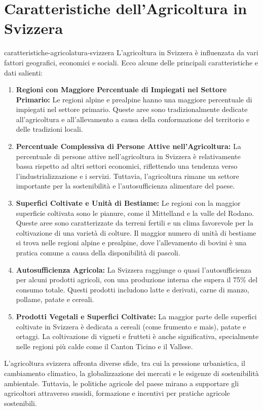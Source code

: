 \documentclass[preview]{standalone}
\begin{document}
\section{Caratteristiche dell'Agricoltura in Svizzera}

\begin{snippet}{caratteristiche-agricolatura-svizzera}
    L'agricoltura in Svizzera è influenzata da vari fattori geografici, economici e sociali. Ecco alcune
    delle principali caratteristiche e dati salienti:
    \begin{enumerate}
        \item \textbf{Regioni con Maggiore Percentuale di Impiegati nel Settore Primario:}
            Le regioni alpine e prealpine hanno una maggiore percentuale di impiegati nel
            settore primario. Queste aree sono tradizionalmente dedicate all'agricoltura e
            all'allevamento a causa della conformazione del territorio e delle tradizioni locali.
        \item \textbf{Percentuale Complessiva di Persone Attive nell'Agricoltura:}
            La percentuale di persone attive nell'agricoltura in Svizzera è relativamente bassa
            rispetto ad altri settori economici, riflettendo una tendenza verso
            l'industrializzazione e i servizi. Tuttavia, l'agricoltura rimane un settore importante
            per la sostenibilità e l'autosufficienza alimentare del paese.
        \item \textbf{Superfici Coltivate e Unità di Bestiame:}
            Le regioni con la maggior superficie coltivata sono le pianure, come il Mittelland e la
            valle del Rodano. Queste aree sono caratterizzate da terreni fertili e un clima
            favorevole per la coltivazione di una varietà di colture.
            Il maggior numero di unità di bestiame si trova nelle regioni alpine e prealpine, dove
            l'allevamento di bovini è una pratica comune a causa della disponibilità di pascoli.
        \item \textbf{Autosufficienza Agricola:}
            La Svizzera raggiunge o quasi l'autosufficienza per alcuni prodotti agricoli, con una
            produzione interna che supera il 75\% del consumo totale. Questi prodotti includono
            latte e derivati, carne di manzo, pollame, patate e cereali.
        \item \textbf{Prodotti Vegetali e Superfici Coltivate:}
            La maggior parte delle superfici coltivate in Svizzera è dedicata a cereali (come
            frumento e mais), patate e ortaggi. La coltivazione di vigneti e frutteti è anche
            significativa, specialmente nelle regioni più calde come il Canton Ticino e il Vallese.
    \end{enumerate}

    L'agricoltura svizzera affronta diverse sfide, tra cui la pressione urbanistica, il cambiamento
    climatico, la globalizzazione dei mercati e le esigenze di sostenibilità ambientale. Tuttavia, le
    politiche agricole del paese mirano a supportare gli agricoltori attraverso sussidi, formazione e
    incentivi per pratiche agricole sostenibili.
\end{snippet}
\end{document}
